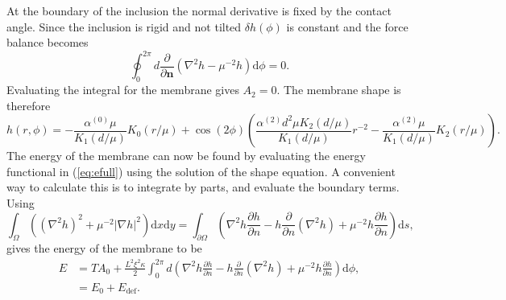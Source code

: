 At the boundary of the inclusion the normal derivative is fixed by the contact angle. Since the inclusion is rigid and not tilted $\delta h(\phi)$ is constant and the force balance becomes
\begin{equation}
    \oint_0^{2\pi}d\frac{\partial}{\partial \textbf{n}}\left(\nabla^2 h - \mu^{-2} h \right) \text{d}\phi = 0.
\end{equation}
Evaluating the integral for the membrane gives $A_{2} = 0$. The membrane shape is therefore
\begin{equation}
    h(r, \phi) = -\frac{\alpha^{(0)}\mu}{K_{1}(d/\mu)}K_{0}(r/\mu) + \cos(2\phi)\left(\frac{\alpha^{(2)} d^2 \mu K_{2}(d/\mu)}{ K_{1}(d/\mu)}r^{-2}-\frac{\alpha^{(2)}\mu
    }{K_{1}(d/\mu)}K_{2}(r/\mu)\right).
\end{equation}
The energy of the membrane can now be found by evaluating the energy functional in (\ref{eq:efull}) using the solution of the shape equation. A convenient way to calculate this is to integrate by parts, and evaluate the boundary terms. Using
\begin{equation}
    \int_{\Omega}\left((\nabla^2 h)^2 + \mu^{-2}|\nabla h|^2\right) \text{d}x\text{d}y = \int_{\partial\Omega}\left(\nabla^2 h\frac{\partial h}{\partial n} - h\frac{\partial}{\partial n}(\nabla^2 h) + \mu^{-2}h\frac{\partial h}{\partial n}\right) \text{d}s,
    \label{eq:eparts}
\end{equation}
gives the energy of the membrane to be
\begin{align}
    E &= TA_0 + \frac{L^2\xi^2\kappa}{2}\int_{0}^{2\pi}d\left(\nabla^2 h\frac{\partial h}{\partial n} - h\frac{\partial}{\partial n}(\nabla^2 h) + \mu^{-2}h\frac{\partial h}{\partial n}\right)\text{d}\phi, \\
    &= E_0 + E_{\text{def}}.
\end{align}
